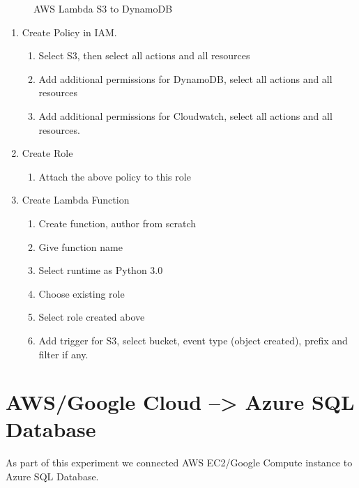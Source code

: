 \begin{figure}[!htb]
    \caption{\label{fig:S3_DynamoDB} AWS Lambda S3 to DynamoDB}
\end{figure}

\begin{enumerate}
 \item Create Policy in IAM. 
 \begin{enumerate}
 	\item Select S3, then select all actions and all resources
	\item Add additional permissions for DynamoDB, select all actions and all resources
	\item Add additional permissions for Cloudwatch, select all actions and all resources.
 \end{enumerate}  
 \item Create Role
 \begin{enumerate}
 	\item Attach the above policy to this role
\end{enumerate}
 \item Create Lambda Function
 \begin{enumerate} 
 	\item Create function, author from scratch
 	\item Give function name
 	\item Select runtime as Python 3.0
 	\item Choose existing role
 	\item Select role created above
 	\item Add trigger for S3, select bucket, event type (object created), prefix and filter if any.
 \end{enumerate}
\end{enumerate}

\section{AWS/Google Cloud --> Azure SQL Database}
As part of this experiment we connected AWS EC2/Google Compute instance to Azure SQL Database.

